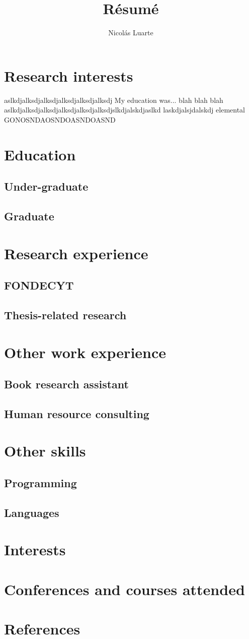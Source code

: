 \documentclass{article}
\begin{document}
\title{R\'esum\'e}
\author{Nicolás Luarte}


\maketitle

\section{Research interests}
aslkdjalksdjalksdjalksdjalksdjalksdj
My education was... blah blah blah aslkdjalksdjalksdjalksdjalksdjalksdjslkdjalskdjaslkd laskdjalsjdalskdj
elemental GONOSNDAOSNDOASNDOASND
\section{Education}
\blindtext
\subsection{Under-graduate}
\blindtext
\subsection{Graduate}
\blindtext
\section{Research experience}
\blindtext
\subsection{FONDECYT}
\blindtext
\subsection{Thesis-related research}
\blindtext
\section{Other work experience}
\blindtext
\subsection{Book research assistant}
\blindtext
\subsection{Human resource consulting}
\blindtext  
\section{Other skills}
\blindtext
\subsection{Programming}
\blindtext
\subsection{Languages}
\blindtext
\section{Interests}
\blindtext
\section{Conferences and courses attended}
\blindtext
\section{References}
\blindtext
\end{document}
